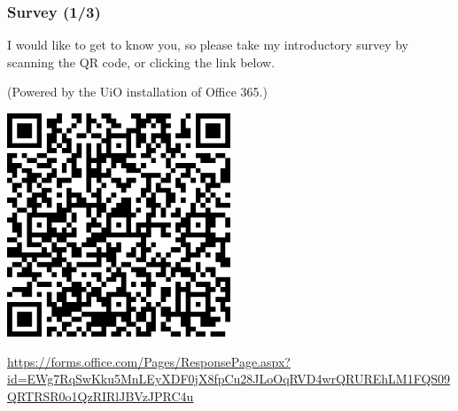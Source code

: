 \def\arraystretch{1.2}

\begin{frame}

\frametitle{Survey (1/3)}

\begin{center}

I would like to get to know you, so please take my introductory survey
by scanning the QR code, or clicking the link below.

(Powered by the UiO installation of Office 365.)

\vspace{\fill}

\includegraphics[width=0.5\textwidth]{survey-qr-code.png}

\vspace{\fill}

\noindent\scriptsize{\url{https://forms.office.com/Pages/ResponsePage.aspx?id=EWg7RqSwKku5MnLEyXDF0jX8fpCu28JLoOqRVD4wrQRUREhLM1FQS09QRTRSR0o1QzRIRlJBVzJPRC4u}}

\end{center}

\end{frame}

